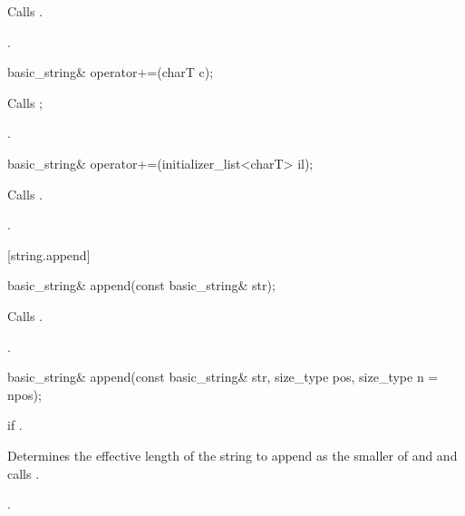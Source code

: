 \begin{itemdescr}
\pnum
\effects Calls .

\pnum
\returns
{}.
\end{itemdescr}

%
\begin{itemdecl}
basic_string& operator+=(charT c);
\end{itemdecl}

\begin{itemdescr}
\pnum
\effects Calls ;

\pnum
\returns
{}.
\end{itemdescr}

%
\begin{itemdecl}
basic_string& operator+=(initializer_list<charT> il);
\end{itemdecl}

\begin{itemdescr}
\pnum
\effects Calls .

\pnum
\returns {}.
\end{itemdescr}


[string.append]{}

%
\begin{itemdecl}
basic_string& append(const basic_string& str);
\end{itemdecl}

\begin{itemdescr}
\pnum
\effects Calls .

\pnum
\returns
{}.
\end{itemdescr}

%
\begin{itemdecl}
basic_string& append(const basic_string& str, size_type pos, size_type n = npos);
\end{itemdecl}

\begin{itemdescr}
\pnum
\throws
{}
if
.

\pnum
\effects
Determines the effective length 
of the string to append as the smaller of  and
 and calls .

\pnum
\returns
{}.
\end{itemdescr}

